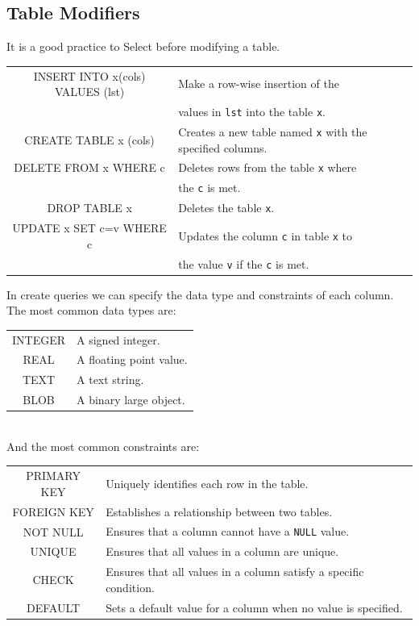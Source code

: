 \documentclass[5pt]{article}
\begin{document}
\begin{multicols}{2}
\subsection{Table Modifiers}
It is a good practice to Select before modifying a table.\\
\begin{tabular}{C L}
    INSERT INTO x(cols) VALUES (lst) & Make a row-wise insertion of the\\
                                     & values in \texttt{lst} into the table \texttt{x}.\\
    CREATE TABLE x (cols)            & Creates a new table named \texttt{x} with the specified columns.\\
    DELETE FROM x WHERE c            & Deletes rows from the table \texttt{x} where\\
                                     & the \texttt{c} is met.\\
    DROP TABLE x                     & Deletes the table \texttt{x}.\\
    UPDATE x SET c=v WHERE c         & Updates the column \texttt{c} in table \texttt{x} to\\
                                     & the value \texttt{v} if the \texttt{c} is met.\\
\end{tabular}
In create queries we can specify the data type and constraints of each column. The most common data types are:
\begin{tabular}{C L}
    INTEGER & A signed integer.\\
    REAL    & A floating point value.\\
    TEXT    & A text string.\\
    BLOB    & A binary large object.\\
\end{tabular}\\
And the most common constraints are:\\
\begin{tabular}{C L}
    PRIMARY KEY & Uniquely identifies each row in the table.\\
    FOREIGN KEY & Establishes a relationship between two tables.\\
    NOT NULL    & Ensures that a column cannot have a \texttt{NULL} value.\\
    UNIQUE      & Ensures that all values in a column are unique.\\
    CHECK       & Ensures that all values in a column satisfy a specific condition.\\
    DEFAULT     & Sets a default value for a column when no value is specified.\\
\end{tabular}


\end{multicols}
\end{document}
